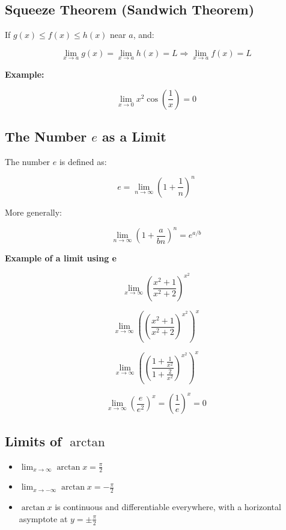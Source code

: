 \subsection{Squeeze Theorem (Sandwich Theorem)}

If \(g(x) \le f(x) \le h(x)\) near \(a\), and:

\[
    \lim_{x \to a} g(x) = \lim_{x \to a} h(x) = L
    \Rightarrow \lim_{x \to a} f(x) = L
\]

\textbf{Example:}

\[
    \lim_{x \to 0} x^2 \cos\left( \frac{1}{x} \right) = 0
\]

\subsection{The Number \texorpdfstring{\(e\)}{e} as a Limit}

The number \(e\) is defined as:

\[
    e = \lim_{n \to \infty} {\left(1 + \frac{1}{n} \right)}^n
\]

More generally:

\[
    \lim_{n \to \infty} {\left(1 + \frac{a}{bn} \right)}^n = e^{a/b}
\]

\textbf{Example of a limit using e}

\[
    \lim_{x \to \infty}{\left(\frac{x^2 + 1}{x^2 +2}\right)}^{x^2}
\]

\[
    \lim_{x \to \infty} {\left({\left(\frac{x^2 + 1}{x^2 +2}\right)}^{x^2}\right)}^x
\]

\[
    \lim_{x \to \infty} {\left({\left(\frac{1 + \frac{1}{x^2}}{1 + \frac{2}{x^2}}\right)}^{x^2}\right)}^x
\]

\[
    \lim_{x \to \infty} {\left(\frac{e}{e^2}\right)}^x = {\left(\frac{1}{e}\right)}^x = 0
\]

\subsection{Limits of \texorpdfstring{\(\arctan\)}{arctan}}

\begin{itemize}

    \item \(\lim_{x \to \infty} \arctan x = \frac{\pi}{2}\)

    \item \(\lim_{x \to -\infty} \arctan x = -\frac{\pi}{2}\)

    \item \(\arctan x\) is continuous and differentiable everywhere, with a horizontal asymptote at 
    \(y = \pm \frac{\pi}{2}\)

\end{itemize}

